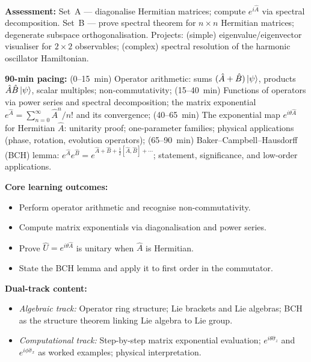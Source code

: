 \documentclass[11pt,a4paper]{article}
\begin{document}
\begin{tcolorbox}[modulebox, title={Module~I.1 / L03: Observables, Hermitian Operators, and the Spectral Theorem}]
\medskip\textbf{Assessment:}
Set~A --- diagonalise Hermitian matrices; compute $e^{i\hat{A}}$ via spectral decomposition.
Set~B --- prove spectral theorem for $n\times n$ Hermitian matrices; degenerate subspace orthogonalisation.
Projects: (simple) eigenvalue/eigenvector visualiser for $2\times 2$ observables; (complex) spectral resolution
of the harmonic oscillator Hamiltonian.
\end{tcolorbox}

\medskip

\begin{tcolorbox}[modulebox, title={Module~I.1 / L04: Operator Algebra and the Exponential Map}]
\textbf{90-min pacing:} (0--15~min) Operator arithmetic: sums $(\hat{A}+\hat{B})\ket{\psi}$,
products $\hat{A}\hat{B}\ket{\psi}$, scalar multiples; non-commutativity;
(15--40~min) Functions of operators via power series and spectral decomposition;
the matrix exponential $e^{\hat{A}} = \sum_{n=0}^\infty \hat{A}^n/n!$ and its convergence;
(40--65~min) The exponential map $e^{i\theta\hat{A}}$ for Hermitian $\hat{A}$: unitarity proof;
one-parameter families; physical applications (phase, rotation, evolution operators);
(65--90~min) Baker--Campbell--Hausdorff (BCH) lemma: $e^{\hat{A}}e^{\hat{B}} = e^{\hat{A}+\hat{B}+\frac{1}{2}[\hat{A},\hat{B}]+\cdots}$;
statement, significance, and low-order applications.

\medskip\textbf{Core learning outcomes:}
\begin{itemize}[leftmargin=1.4em,topsep=2pt,itemsep=1pt]
  \item Perform operator arithmetic and recognise non-commutativity.
  \item Compute matrix exponentials via diagonalisation and power series.
  \item Prove $\hat{U}=e^{i\theta\hat{A}}$ is unitary when $\hat{A}$ is Hermitian.
  \item State the BCH lemma and apply it to first order in the commutator.
\end{itemize}

\medskip\textbf{Dual-track content:}
\begin{itemize}[leftmargin=1.4em,topsep=2pt,itemsep=1pt]
  \item \textit{Algebraic track:} Operator ring structure; Lie brackets and Lie algebras;
    BCH as the structure theorem linking Lie algebra to Lie group.
  \item \textit{Computational track:} Step-by-step matrix exponential evaluation;
    $e^{i\theta\hat{\sigma}_z}$ and $e^{i\phi\hat{\sigma}_x}$ as worked examples; physical interpretation.
\end{itemize}


\end{tcolorbox}
\end{document}
